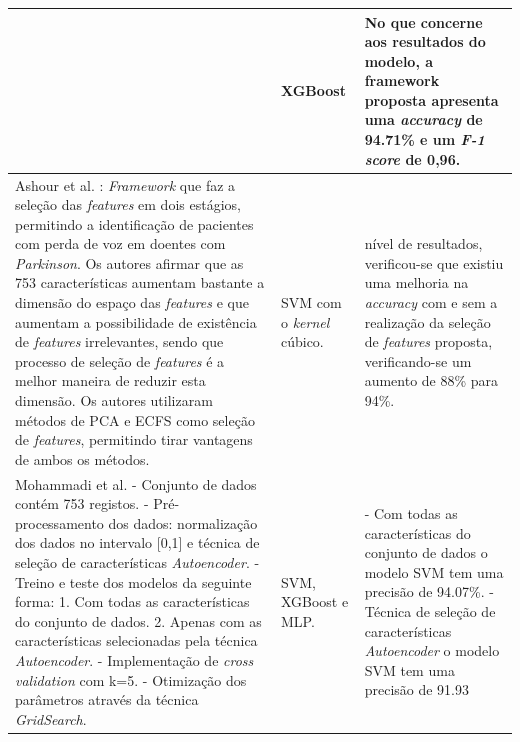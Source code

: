 \documentclass[12pt,a4paper,twoside]{report}
\begin{document}
{\begin{longtable}{|p{6cm}|p{4cm}|p{6cm}|}
& \gls{XGBoost}

& No que concerne aos resultados do modelo, a framework proposta apresenta uma \textit{accuracy} de 94.71\% e um \textit{F-1 score} de 0,96. \\ \hline

Ashour et al. \cite{9072452}:
\textit{Framework} que faz a seleção das \textit{features} em dois estágios, permitindo a identificação de pacientes com perda de voz em doentes com \textit{Parkinson}. Os autores afirmar que as 753 características aumentam bastante a dimensão do espaço das \textit{features} e que aumentam a possibilidade de existência de \textit{features} irrelevantes, sendo que processo de seleção de \textit{features} é a melhor maneira de reduzir esta dimensão. Os autores utilizaram métodos de \gls{PCA} e \gls{ECFS} como seleção de \textit{features}, permitindo tirar vantagens de ambos os métodos.

&\gls{SVM} com o \textit{kernel} cúbico. 

&nível de resultados, verificou-se que existiu uma melhoria na \textit{accuracy} com e sem a realização da seleção de \textit{features} proposta, verificando-se um aumento de 88\% para 94\%. \\ \hline

Mohammadi et al.\cite{MOHAMMADI2021100079}
- Conjunto de dados contém 753 registos.
- Pré-processamento dos dados: normalização dos dados
no intervalo [0,1] e técnica de seleção de características
\textit{Autoencoder}.
- Treino e teste dos modelos da seguinte forma:
1. Com todas as características do conjunto de
dados.
2. Apenas com as características selecionadas
pela técnica \textit{Autoencoder}.
- Implementação de \textit{cross validation} com k=5.
- Otimização dos parâmetros através da técnica
\textit{GridSearch}.

& \gls{SVM}, \gls{XGBoost} e \gls{MLP}.
& - Com todas as características do conjunto
de dados o modelo \gls{SVM} tem uma
precisão de 94.07\%.
- Técnica de seleção de
características \textit{Autoencoder}
o modelo \gls{SVM} tem uma precisão
de 91.93%
 \\ \hline


\end{longtable}}
\end{document}
